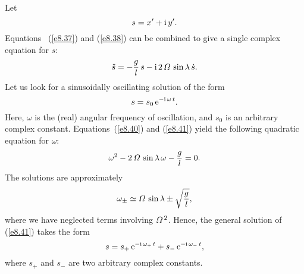 Let
\begin{equation}\label{e8.39}
s = x' + {\rm i}\,y'.
\end{equation}
Equations ~(\ref{e8.37})  and (\ref{e8.38}) can be combined to give a single complex
equation for $s$:
\begin{equation}\label{e8.40}
\ddot{s} = -\frac{g}{l}\,s - {\rm i}\,2\,{\mit\Omega}\,\sin\lambda\,\dot{s}.
\end{equation}
Let us look for a sinusoidally oscillating solution of the form
\begin{equation}\label{e8.41}
s = s_0\,{\rm e}^{-{\rm i}\,\omega\,t}.
\end{equation}
Here, $\omega$ is the (real) angular frequency of oscillation, and $s_0$
is an arbitrary complex constant. Equations~(\ref{e8.40}) and (\ref{e8.41})
yield the following quadratic equation for $\omega$:
\begin{equation}
\omega^2 - 2\,{\mit\Omega}\,\sin\lambda\,\omega - \frac{g}{l}=0.
\end{equation}
The solutions are approximately
\begin{equation}
\omega_{\pm} \simeq {\mit\Omega}\,\sin\lambda \pm \sqrt{\frac{g}{l}},
\end{equation}
where we have neglected terms involving ${\mit\Omega}^{\,2}$. 
Hence, the general solution of (\ref{e8.41}) takes the form
\begin{equation}
s = s_+\, {\rm e}^{-{\rm i}\,\omega_+\,t}+s_-\, {\rm e}^{-{\rm i}\,
\omega_-\,t},
\end{equation}
where $s_+$ and $s_-$ are two arbitrary complex constants.

